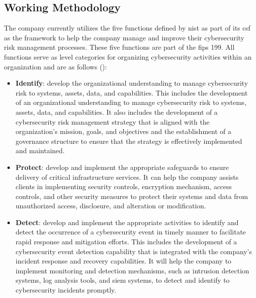 \begin{multicols}{2}
      \subsection{Working Methodology}
      The company currently utilizes the five functions defined by \acrshort{nist} as part of its \acrshort{csf} as
      the framework to help the company manage and improve their cybersecurity risk management processes. These five
      functions are part of the \acrshort{fips} 199. All functions serve as level categories for organizing
      cybersecurity activities within an organization and are as follows (\cite{nist}):
      \begin{itemize}
            \item \textbf{Identify}: develop the organizational understanding to manage cybersecurity risk to
                  systems, assets, data, and capabilities. This includes the development of an organizational
                  understanding to manage cybersecurity risk to systems, assets, data, and capabilities. It also
                  includes the development of a cybersecurity risk management strategy that is aligned with the
                  organization's mission, goals, and objectives and the establishment of a governance structure to
                  ensure that the strategy is effectively implemented and maintained.
            \item \textbf{Protect}: develop and implement the appropriate safeguards to ensure delivery of critical
                  infrastructure services. It can help the company assists clients in implementing security controls,
                  encryption mechanism, access controls, and other security measures to protect their systems and
                  data from unauthorized access, disclosure, and alteration or modification.
            \item \textbf{Detect}: develop and implement the appropriate activities to identify and detect the
                  occurrence of a cybersecurity event in timely manner to facilitate rapid response and mitigation
                  efforts. This includes the development of a cybersecurity event detection capability that is
                  integrated with the company's incident response and recovery capabilities. It will help the
                  company to implement monitoring and detection mechanisms, such as intrusion detection systems,
                  log analysis tools, and \acrshort{siem} systems, to detect and identify to cybersecurity incidents
                  promptly.

\end{itemize}
\end{multicols}
